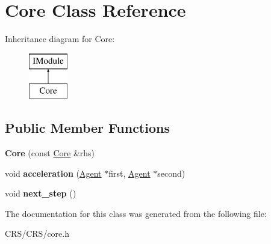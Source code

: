 \hypertarget{class_core}{}\section{Core Class Reference}
\label{class_core}
Inheritance diagram for Core\+:\begin{figure}[H]
\begin{center}
\leavevmode
\includegraphics[height=2.000000cm]{class_core}
\end{center}
\end{figure}
\subsection*{Public Member Functions}
\begin{DoxyCompactItemize}
\item 
\mbox{\label{class_core_a5afb68389500c9f0537e852e486501b7}} 
{\bfseries Core} (const \hyperlink{class_core}{Core} \&rhs)
\item 
\mbox{\label{class_core_a1b155431739410134fb6c49cc0cd0708}} 
void {\bfseries acceleration} (\hyperlink{class_agent}{Agent} $\ast$first, \hyperlink{class_agent}{Agent} $\ast$second)
\item 
\mbox{\label{class_core_a4700f739d7171c6e65603b34a2def048}} 
void {\bfseries next\+\_\+step} ()
\end{DoxyCompactItemize}


The documentation for this class was generated from the following file\+:\begin{DoxyCompactItemize}
\item 
C\+R\+S/\+C\+R\+S/core.\+h\end{DoxyCompactItemize}
